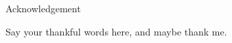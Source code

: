\vspace{5cm}

{\huge \centerline {Acknowledgement}}
\vspace{1cm}

Say your thankful words here, and maybe thank me.